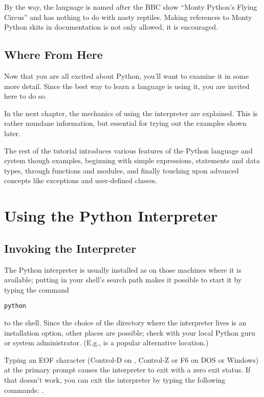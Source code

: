 By the way, the language is named after the BBC show ``Monty Python's
Flying Circus'' and has nothing to do with nasty reptiles.  Making
references to Monty Python skits in documentation is not only allowed,
it is encouraged.  

\section{Where From Here}

Now that you are all excited about Python, you'll want to examine it
in some more detail.  Since the best way to learn a language is
using it, you are invited here to do so.

In the next chapter, the mechanics of using the interpreter are
explained.  This is rather mundane information, but essential for
trying out the examples shown later.

The rest of the tutorial introduces various features of the Python
language and system though examples, beginning with simple
expressions, statements and data types, through functions and modules,
and finally touching upon advanced concepts like exceptions
and user-defined classes.

\chapter{Using the Python Interpreter}

\section{Invoking the Interpreter}

The Python interpreter is usually installed as 
on those machines where it is available; putting  in
your \UNIX{} shell's search path makes it possible to start it by
typing the command

\bcode\begin{verbatim}
python
\end{verbatim}\ecode
%
to the shell.  Since the choice of the directory where the interpreter
lives is an installation option, other places are possible; check with
your local Python guru or system administrator.  (E.g.,
 is a popular alternative location.)

Typing an EOF character (Control-D on \UNIX{}, Control-Z or F6 on DOS
or Windows) at the primary prompt causes the interpreter to exit with
a zero exit status.  If that doesn't work, you can exit the
interpreter by typing the following commands: .

